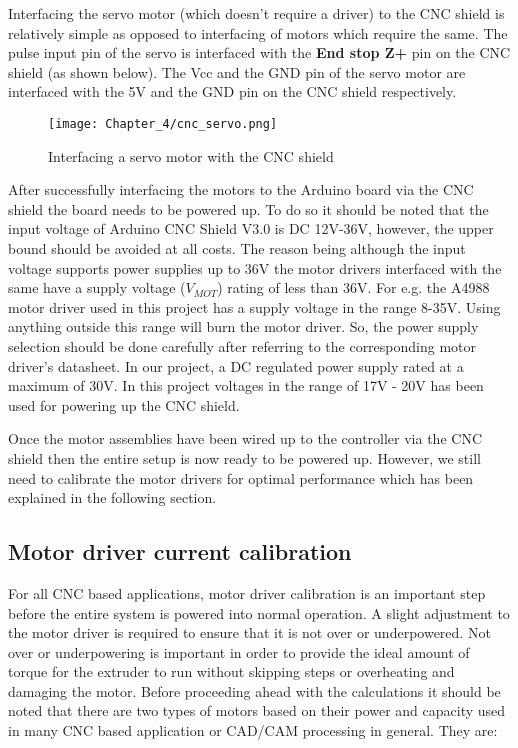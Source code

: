 Interfacing the servo motor (which doesn’t require a driver) to the CNC shield is relatively simple as opposed to interfacing of motors which require the same. The pulse input pin of the servo is interfaced with the \textbf{End stop Z+} pin on the CNC shield (as shown below). The Vcc and the GND pin of the servo motor are interfaced with the 5V and the GND pin on the CNC shield respectively. \par

\begin{figure}[h]
    \centering
    \texttt{[image: Chapter\_4/cnc\_servo.png]}
    \caption{Interfacing a servo motor with the CNC shield}
    \label{fig:cnc_servo}
\end{figure} 

After successfully interfacing the motors to the Arduino board via the CNC shield the board needs to be powered up. To do so it should be noted that the input voltage of Arduino CNC Shield V3.0 is DC 12V-36V, however, the upper bound should be avoided at all costs. The reason being although the input voltage supports power supplies up to 36V the motor drivers interfaced with the same have a supply voltage ($V_{MOT}$) rating of less than 36V. For e.g. the A4988 motor driver used in this project has a supply voltage in the range 8-35V. Using anything outside this range will burn the motor driver. So, the power supply selection should be done carefully after referring to the corresponding motor driver’s datasheet. In our project, a DC regulated power supply rated at a maximum of 30V. In this project voltages in the range of 17V - 20V has been used for powering up the CNC shield. \par

Once the motor assemblies have been wired up to the controller via the CNC shield then the entire setup is now ready to be powered up. However, we still need to calibrate the motor drivers for optimal performance which has been explained in the following section.


\subsection{Motor driver current calibration}

For all CNC based applications, motor driver calibration is an important step before the entire system is powered into normal operation. A slight adjustment to the motor driver is required to ensure that it is not over or underpowered. Not over or underpowering is important in order to provide the ideal amount of torque for the extruder to run without skipping steps or overheating and damaging the motor. Before proceeding ahead with the calculations it should be noted that there are two types of motors based on their power and capacity used in many CNC based application or CAD/CAM processing in general. They are: 

